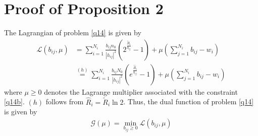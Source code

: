 \documentclass[journal]{IEEEtran}
\begin{document}
\section{Proof of Proposition 2}
The Lagrangian of problem \eqref{q14} is given by
\begin{align}
\mathcal{L}\left(b_{ij}, \mu\right) &=  \sum\limits_{i = 1}^{N_i} \frac{b_{ij}n_0}{\left|h_{ij}\right|^2}\left(2^{\frac{\tilde{R}_i}{b_{ij}}} - 1\right) + \mu\left(\sum_{j = 1}^{N_i}b_{ij} - w_i\right) \nonumber \\ 
& \overset{\left(h\right)}{=} \sum\limits_{i = 1}^{N_i} \frac{b_{ij}N_0}{\left|h_{ij}\right|^2}\left(e^{\frac{\hat{R}_i}{b_{ij}}} - 1\right) + \mu\left(\sum_{j = 1}^{N_i}b_{ij} - w_i\right) 
\end{align}
where $\mu \geq 0$ denotes the Lagrange multiplier associated with the constraint \eqref{q14b}. $\left(h\right)$ follows from $\hat{R}_i = \tilde{R}_i \ln2$. Thus, the dual function of problem \eqref{q14} is given by
\begin{align}
\mathcal{G}\left(\mu\right) = \min_{b_{ij}\geq 0} \mathcal{L}\left(b_{ij},\mu\right)
\end{align}
\end{document}
